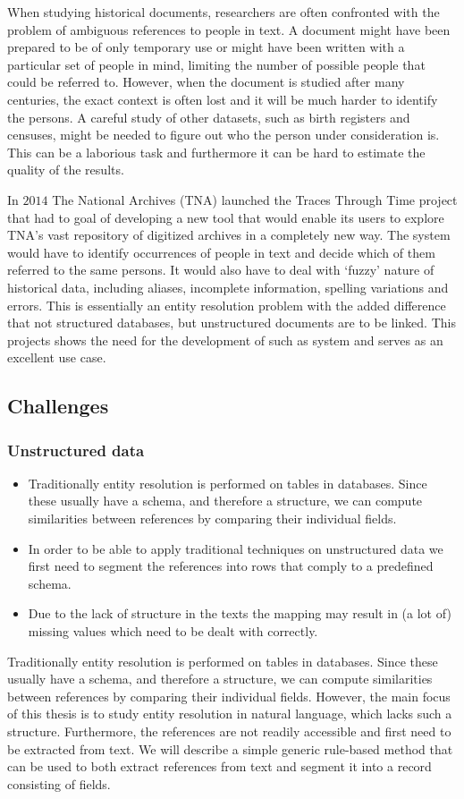 \documentclass[paper=a4, fontsize=11pt]{scrartcl}
\begin{document}
When studying historical documents, researchers are often confronted with the problem of ambiguous references to people in text.
A document might have been prepared to be of only temporary use or might have been written with a particular set of people in mind, limiting the number of possible people that could be referred to.
However, when the document is studied after many centuries, the exact context is often lost and it will be much harder to identify the persons.
A careful study of other datasets, such as birth registers and censuses, might be needed to figure out who the person under consideration is.
This can be a laborious task and furthermore it can be hard to estimate the quality of the results.

In $2014$ The National Archives (TNA) launched the Traces Through Time project that had to goal of developing a new tool that would enable its users to explore TNA's vast repository of digitized archives in a completely new way.
The system would have to identify occurrences of people in text and decide which of them referred to the same persons.
It would also have to deal with `fuzzy' nature of historical data, including aliases, incomplete information, spelling variations and errors.
This is essentially an entity resolution problem with the added difference that not structured databases, but unstructured documents are to be linked.
This projects shows the need for the development of such as system and serves as an excellent use case.

\subsection{Challenges}
\subsubsection{Unstructured data}
\begin{itemize}
	\item Traditionally entity resolution is performed on tables in databases. Since these usually have a schema, and therefore a structure, we can compute similarities between references by comparing their individual fields.
	\item In order to be able to apply traditional techniques on unstructured data we first need to segment the references into rows that comply to a predefined schema.
	\item Due to the lack of structure in the texts the mapping may result in (a lot of) missing values which need to be dealt with correctly.
\end{itemize}
Traditionally entity resolution is performed on tables in databases.
Since these usually have a schema, and therefore a structure, we can compute similarities between references by comparing their individual fields.
However, the main focus of this thesis is to study entity resolution in natural language, which lacks such a structure.
Furthermore, the references are not readily accessible and first need to be extracted from text.
We will describe a simple generic rule-based method that can be used to both extract references from text and segment it into a record consisting of fields.
\end{document}
